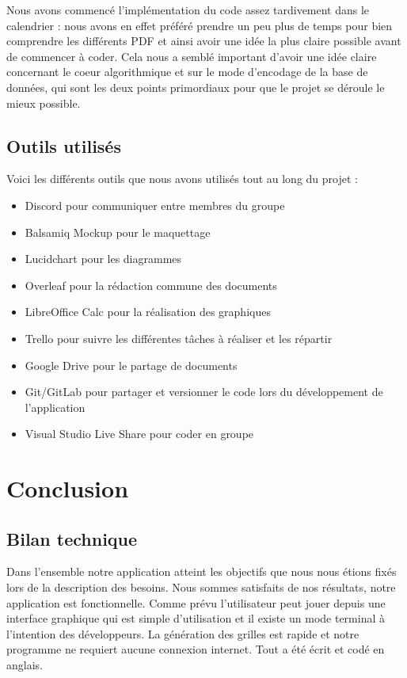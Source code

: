 \documentclass [ 11 pt ] {article}
\begin{document}
Nous avons commencé l'implémentation du code assez tardivement dans le calendrier : nous avons en effet préféré prendre un peu plus de temps pour bien comprendre les différents PDF et ainsi avoir une idée la plus claire possible avant de commencer à coder. Cela nous a semblé important d'avoir une idée claire concernant le coeur algorithmique et sur le mode d'encodage de la base de données, qui sont les deux points primordiaux pour que le projet se déroule le mieux possible. 

\subsection{Outils utilisés}
Voici les différents outils que nous avons utilisés tout au long du projet :
\begin{itemize}
    \item Discord pour communiquer entre membres du groupe
    \item Balsamiq Mockup pour le maquettage
    \item Lucidchart pour les diagrammes
    \item Overleaf pour la rédaction commune des documents
    \item LibreOffice Calc pour la réalisation des graphiques
    \item Trello pour suivre les différentes tâches à réaliser et les répartir
    \item Google Drive pour le partage de documents
    \item Git/GitLab pour partager et versionner le code lors du développement de l’application
    \item Visual Studio Live Share pour coder en groupe 
\end{itemize}

\newpage
\section{Conclusion}

\subsection{Bilan technique} 
Dans l'ensemble notre application atteint les objectifs que nous nous étions fixés lors de la description des besoins. Nous sommes satisfaits de nos résultats, notre application est fonctionnelle. Comme prévu l'utilisateur peut jouer depuis une interface graphique qui est simple d'utilisation et il existe un mode terminal à l'intention des développeurs. La génération des grilles est rapide et notre programme ne requiert aucune connexion internet. Tout a été écrit et codé en anglais. \\
\end{document}
